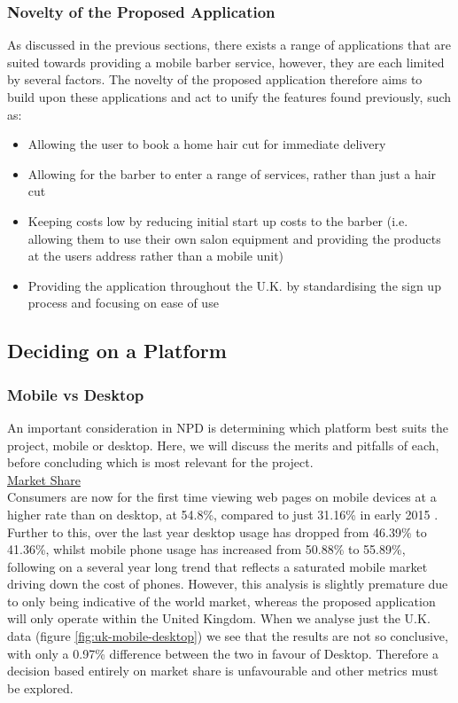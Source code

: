 \documentclass[12pt]{article}
\begin{document}
	\subsubsection{Novelty of the Proposed Application}
	As discussed in the previous sections, there exists a range of applications that are suited towards providing a mobile barber service, however, they are each limited by several factors. The novelty of the proposed application therefore aims to build upon these applications and act to unify the features found previously, such as:
	\begin{itemize}
		\item Allowing the user to book a home hair cut for immediate delivery
		\item Allowing for the barber to enter a range of services, rather than just a hair cut
		\item Keeping costs low by reducing initial start up costs to the barber (i.e. allowing them to use their own salon equipment and providing the products at the users address rather than a mobile unit)
		\item Providing the application throughout the U.K. by standardising the sign up process and focusing on ease of use
	\end{itemize}
	
	\subsection{Deciding on a Platform}
	\label{chap:platform}
	
	\subsubsection{Mobile vs Desktop}
	An important consideration in NPD is determining which platform best suits the project, mobile or desktop. Here, we will discuss the merits and pitfalls of each, before concluding which is most relevant for the project. 
	\\
	
	\noindent
	\underline{Market Share}
	\\
	\noindent
	Consumers are now for the first time viewing web pages on mobile devices at a higher rate than on desktop, at 54.8\%, compared to just 31.16\% in early 2015 \cite{MobilePercentageWebsite2021}. Further to this, over the last year desktop usage has dropped from 46.39\% to 41.36\%, whilst mobile phone usage has increased from 50.88\% to 55.89\%, following on a several year long trend \cite{DesktopVsMobile2021} that reflects a saturated mobile market driving down the cost of phones. However, this analysis is slightly premature due to only being indicative of the world market, whereas the proposed application will only operate within the United Kingdom. When we analyse just the U.K. data (figure \ref{fig:uk-mobile-desktop}) we see that the results are not so conclusive, with only a 0.97\% difference between the two in favour of Desktop. Therefore a decision based entirely on market share is unfavourable and other metrics must be explored.
	
\end{document}
